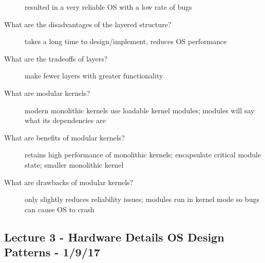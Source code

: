 \documentclass[10pt]{article}
\begin{document}
\begin{description}
  resulted in a very reliable OS with a low rate of bugs
\item[What are the disadvantages of the layered structure?]
  takes a long time to design/implement, reduces OS performance
\item[What are the tradeoffs of layers?]
  make fewer layers with greater functionality
\item[What are modular kernels?]
  modern monolithic kernels use loadable kernel modules; modules will say what its dependencies are
\item[What are benefits of modular kernels?]
  retains high performance of monolithic kernels;
  encapsulate critical module state;
  smaller monolithic kernel
\item[What are drawbacks of modular kernels?]
  only slightly reduces reliability issues;
  modules run in kernel mode so bugs can cause OS to crash
\end{description}


\begin{description}
\section{Lecture 3 - Hardware Details OS Design Patterns - 1/9/17}
\item[]
\end{description}
\end{document}
